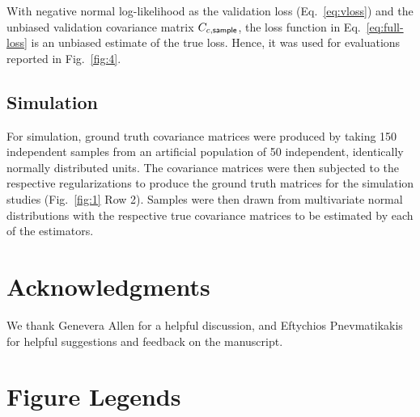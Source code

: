 With negative normal log-likelihood as the validation loss  (Eq.~\ref{eq:vloss}) and the unbiased validation covariance matrix $C_{c,\sf sample}$, the loss function in Eq.~\ref{eq:full-loss} is an unbiased estimate of the true loss. Hence, it was used for evaluations reported in Fig.~\ref{fig:4}.

\subsection*{Simulation}
For simulation, ground truth covariance matrices were produced by taking 150 independent samples from an artificial population of 50 independent, identically normally distributed units. The covariance matrices were then subjected to the respective regularizations to produce the ground truth matrices for the simulation studies (Fig.~\ref{fig:1} Row 2). Samples were then drawn from multivariate normal distributions with the respective true covariance matrices to be estimated by each of the estimators.


\section*{Acknowledgments}
We thank Genevera Allen for a helpful discussion, and Eftychios Pnevmatikakis for helpful suggestions and feedback on the manuscript.  

%
%
% 


\newpage
\section*{Figure Legends}

